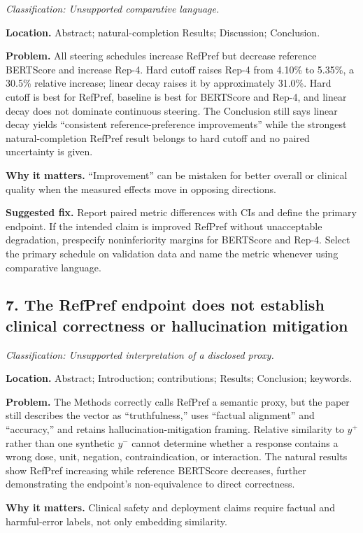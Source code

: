 \documentclass[11pt]{article}
\newcommand{\findinglabel}[1]{\textbf{#1}}
\newcommand{\classification}[1]{\textit{Classification: #1.}}
\begin{document}
\classification{Unsupported comparative language}

\findinglabel{Location.} Abstract; natural-completion Results; Discussion; Conclusion.

\findinglabel{Problem.} All steering schedules increase RefPref but decrease reference BERTScore and increase Rep-4.  Hard cutoff raises Rep-4 from 4.10\% to 5.35\%, a 30.5\% relative increase; linear decay raises it by approximately 31.0\%.  Hard cutoff is best for RefPref, baseline is best for BERTScore and Rep-4, and linear decay does not dominate continuous steering.  The Conclusion still says linear decay yields ``consistent reference-preference improvements'' while the strongest natural-completion RefPref result belongs to hard cutoff and no paired uncertainty is given.

\findinglabel{Why it matters.} ``Improvement'' can be mistaken for better overall or clinical quality when the measured effects move in opposing directions.

\findinglabel{Suggested fix.} Report paired metric differences with CIs and define the primary endpoint.  If the intended claim is improved RefPref without unacceptable degradation, prespecify noninferiority margins for BERTScore and Rep-4.  Select the primary schedule on validation data and name the metric whenever using comparative language.

\subsection*{7. The RefPref endpoint does not establish clinical correctness or hallucination mitigation}

\classification{Unsupported interpretation of a disclosed proxy}

\findinglabel{Location.} Abstract; Introduction; contributions; Results; Conclusion; keywords.

\findinglabel{Problem.} The Methods correctly calls RefPref a semantic proxy, but the paper still describes the vector as ``truthfulness,'' uses ``factual alignment'' and ``accuracy,'' and retains hallucination-mitigation framing.  Relative similarity to $y^+$ rather than one synthetic $y^-$ cannot determine whether a response contains a wrong dose, unit, negation, contraindication, or interaction.  The natural results show RefPref increasing while reference BERTScore decreases, further demonstrating the endpoint's non-equivalence to direct correctness.

\findinglabel{Why it matters.} Clinical safety and deployment claims require factual and harmful-error labels, not only embedding similarity.
\end{document}
